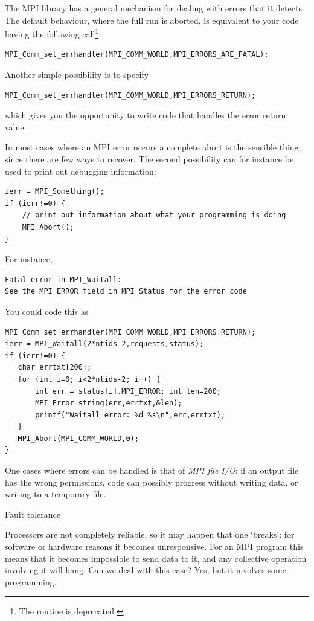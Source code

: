 The MPI library has a general mechanism for dealing with errors that
it detects. The default behaviour, where the full run is aborted, is
equivalent to your code having the following
call\footnote{The routine
   is deprecated.}:
\begin{verbatim}
MPI_Comm_set_errhandler(MPI_COMM_WORLD,MPI_ERRORS_ARE_FATAL);
\end{verbatim}
Another simple possibility is to specify
\begin{verbatim}
MPI_Comm_set_errhandler(MPI_COMM_WORLD,MPI_ERRORS_RETURN);
\end{verbatim}
which gives you the opportunity to write code that handles the error
return value.

In most cases where an MPI error occurs a complete abort is the
sensible thing, since there are few ways to recover. The second
possibility can for instance be used to print out debugging
information:
\begin{verbatim}
ierr = MPI_Something();
if (ierr!=0) {
    // print out information about what your programming is doing
    MPI_Abort();
}
\end{verbatim}
For instance,
\begin{verbatim}
Fatal error in MPI_Waitall: 
See the MPI_ERROR field in MPI_Status for the error code
\end{verbatim}
You could code this as
\begin{verbatim}
MPI_Comm_set_errhandler(MPI_COMM_WORLD,MPI_ERRORS_RETURN);
ierr = MPI_Waitall(2*ntids-2,requests,status);
if (ierr!=0) {
   char errtxt[200];
   for (int i=0; i<2*ntids-2; i++) {
       int err = status[i].MPI_ERROR; int len=200;
       MPI_Error_string(err,errtxt,&len);
       printf("Waitall error: %d %s\n",err,errtxt);
   }
   MPI_Abort(MPI_COMM_WORLD,0);
}
\end{verbatim}
One cases where errors can be handled is that of \emph{MPI file
  I/O}: if an output file has the wrong
permissions, code can possibly progress without writing data, or
writing to a temporary file.

 {Fault tolerance}
\label{mpi:tolerant}

Processors are not completely reliable, so it may happen that one
`breaks': for software or hardware reasons it becomes
unresponsive. For an MPI program this means that it becomes impossible
to send data to it, and any collective operation involving it will
hang. Can we deal with this case? Yes, but it involves some
programming.

